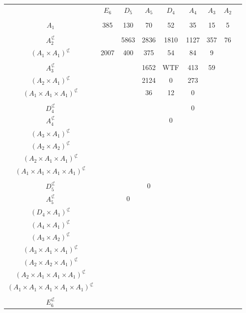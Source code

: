 \documentclass[12pt]{article}
\begin{document}
\begin{center}
\begin{tabular}{ c ||  c | c | c | c | c |  c | c | c |}
 & $E_6$ & $D_5$ & $A_5$ & $D_4$ & $A_4$ & $A_3$ & $A_2$    \\ \cline{1-8} \\[-.44cm]
\cline{1-8} \(A_1 \) & 385 & 130 & 70 & 52 & 35 & 15 & 5  \\ \cline{1-8} \\[-.44cm]
\cline{1-8} \(A_2^{\not\subset} \) & & 5863 & 2836 & 1810 & 1127 & 357 & 76  \\ 
\cline{1-8} \((A_1 \times A_1)^{\not\subset} \)  & 2007 & 400 & 375 & 54 & 84 & 9  \\ \cline{1-7} \\[-.44cm]
\cline{1-7} \(A_3^{\not\subset} \) & & & 1652 & WTF	 & 413 & 59 \\ 
\cline{1-7} \((A_2 \times A_1)^{\not\subset} \) & & & 2124 & 0 & 273 \\ 
\cline{1-6} \((A_1 \times A_1 \times A_1)^{\not\subset} \) & & & 36 & 12 & 0 \\  \cline{1-6} \\[-.44cm]
\cline{1-6} \(D_4^{\not\subset}\) & & & & & 0 \\ 
\cline{1-6} \(A_4^{\not\subset}\) & & & & 0 &  \\ 
\cline{1-6} \((A_3 \times A_1)^{\not\subset} \) & & &  \\ 
\cline{1-4} \((A_2 \times A_2)^{\not\subset} \) & & & \\ 
\cline{1-4} \((A_2 \times A_1 \times A_1)^{\not\subset} \) & & &  \\ 
\cline{1-4} \((A_1 \times A_1 \times A_1 \times A_1)^{\not\subset} \) & & &  \\  \cline{1-4} \\[-.44cm]
\cline{1-4} \(D_5^{\not\subset} \) & & & 0 \\ 
\cline{1-4} \(A_5^{\not\subset} \) & & 0 &  \\ 
\cline{1-4} \((D_4 \times A_1)^{\not\subset} \) &  \\ 
\cline{1-2} \((A_4 \times A_1)^{\not\subset} \) &  \\ 
\cline{1-2} \((A_3 \times A_2)^{\not\subset} \) &  \\ 
\cline{1-2} \((A_3 \times A_1 \times A_1)^{\not\subset} \) & \\ 
\cline{1-2} \((A_2 \times A_2 \times A_1)^{\not\subset} \) & \\ 
\cline{1-2} \((A_2 \times A_1 \times A_1 \times A_1)^{\not\subset} \) & \\ 
\cline{1-2} \((A_1 \times A_1 \times A_1 \times A_1 \times A_1)^{\not\subset} \) & \\ \cline{1-2} \\[-.44cm]
\cline{1-2} \(E_6^{\not\subset} \) & \\ 
\cline{1-2}
\end{tabular}
\vspace{.6cm}



\end{center}
\end{document}
